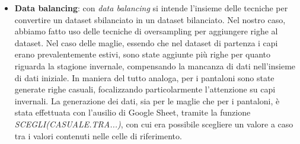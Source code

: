 \documentclass[a4paper, 11pt, oneside]{report}
\begin{document}
\begin{itemize}
                    \item \textbf{Data balancing}: con \textit{data balancing} si intende l'insieme delle tecniche per convertire un dataset sbilanciato in un
                    dataset bilanciato. Nel nostro caso, abbiamo fatto uso delle tecniche di oversampling per aggiungere righe al dataset.
                    Nel caso delle maglie, essendo che nel dataset di partenza i capi erano prevalentemente estivi, sono state aggiunte più righe per quanto riguarda
                    la stagione invernale, compensando la mancanza di dati nell'insieme di dati iniziale. In maniera del tutto analoga, per i pantaloni sono state
                    generate righe casuali, focalizzando particolarmente l'attenzione su capi invernali. La generazione dei dati, sia per le maglie che per i pantaloni,
                    è stata effettuata con l'ausilio di Google Sheet, tramite la funzione \textit{SCEGLI(CASUALE.TRA...)}, con cui era possibile scegliere un valore a caso
                    tra i valori contenuti nelle celle di riferimento.
                \end{itemize}
                \newpage
\end{document}
